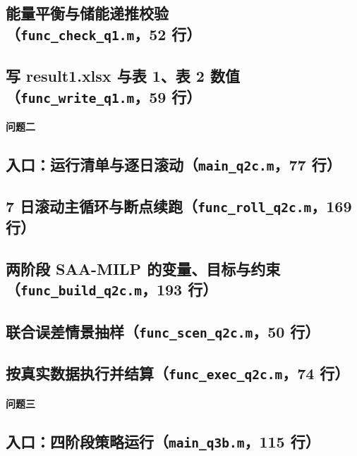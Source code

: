 \subsection{能量平衡与储能递推校验（\texttt{func_check_q1.m}，52 行）}

\subsection{写 result1.xlsx 与表 1、表 2 数值（\texttt{func_write_q1.m}，59 行）}

\begingroup\noindent\textbf{问题二}\par\endgroup

\subsection{入口：运行清单与逐日滚动（\texttt{main_q2c.m}，77 行）}

\subsection{7 日滚动主循环与断点续跑（\texttt{func_roll_q2c.m}，169 行）}

\subsection{两阶段 SAA-MILP 的变量、目标与约束（\texttt{func_build_q2c.m}，193 行）}

\subsection{联合误差情景抽样（\texttt{func_scen_q2c.m}，50 行）}

\subsection{按真实数据执行并结算（\texttt{func_exec_q2c.m}，74 行）}

\begingroup\noindent\textbf{问题三}\par\endgroup

\subsection{入口：四阶段策略运行（\texttt{main_q3b.m}，115 行）}

